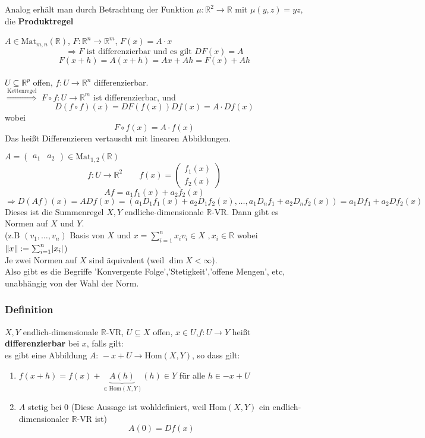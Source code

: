 Analog erhält man durch Betrachtung der Funktion $\mu : \mathbb{R}^2 \to  \mathbb{R}$ mit $\mu(y,z)=yz$, die {\bfseries Produktregel}

$A \in \text{Mat}_{m,n}(\mathbb{R})$, $F: \mathbb{R}^n \to \mathbb{R}^m$, $F(x)=A \cdot x$
\[
	\Rightarrow F \text{ ist differenzierbar und es gilt } DF(x)=A
\]
\[
	F(x+h)=A(x+h)=Ax+Ah=F(x)+Ah
\] \bewende \\
$U \subseteq \mathbb{R}^p$ offen, $f: U \to \mathbb{R}^n$ differenzierbar. \\
$\stackrel{\text{Kettenregel}}{\Rightarrow}$ $F \circ f: U \to \mathbb{R}^m$ ist differenzierbar, und 
\[
	D(f \circ f)(x)= DF(f(x))Df(x) = A \cdot Df(x)
\]
wobei
\[
	F \circ f(x)=A \cdot f(x)
\]
Das heißt Differenzieren vertauscht mit linearen Abbildungen.

$A= \begin{pmatrix}
	a_1 & a_2
\end{pmatrix} \in \text{Mat}_{1,2}(\mathbb{R})$
\[
	f: U \to \mathbb{R}^2 \qquad f(x)= \begin{pmatrix}
		f_1(x) \\ f_2(x)
	\end{pmatrix}
\]
\[
	Af=a_1f_1(x)+a_2f_2(x)
\]
\[
	\Rightarrow D(Af)(x)= A Df(x) = (a_1D_1f_1(x) + a_2D_1f_2(x), \dots, a_1D_nf_1 + a_2D_nf_2(x)) = a_1Df_1 + a_2Df_2(x) 
\]
Dieses ist die Summenregel
$X,Y$ endliche-dimensionale $\mathbb{R}$-VR. Dann gibt es Normen auf $X$ und $Y$. \\
(z.B $(v_1, \dots , v_n)$ Basis von $X$ und $x = \sum^{n}_{i=1}x_iv_i \in X \,\,,x_i \in \mathbb{R}$ wobei $\norm{x}:= \sum^{n}_{i=1}\abs{x_i}$) \\
Je zwei Normen auf $X$ sind äquivalent (weil $\dim X < \infty$). \\
Also gibt es die Begriffe 'Konvergente Folge','Stetigkeit','offene Mengen', etc, unabhängig von der Wahl der Norm.

\subsubsection{Definition} %
\label{ssub:definition}
$X,Y$ endlich-dimensionale $\mathbb{R}$-VR, $U \subseteq X$ offen, $x \in U$,$f: U \to Y$ heißt {\bfseries differenzierbar} bei $x$, falls gilt: \\
es gibt eine Abbildung $A: \,-x+U \to \text{Hom}(X,Y)$, so dass gilt:
\begin{enumerate}
	\item $f(x+h)=f(x)+\underset{\in \text{Hom}(X,Y)}{\underbrace{A(h)}}(h) \in Y$ für alle $h \in -x+U$
	\item $A$ stetig bei $0$ (Diese Aussage ist wohldefiniert, weil $\text{Hom}(X,Y)$ ein endlich-dimensionaler $\mathbb{R}$-VR ist)
	\[
		A(0)=Df(x)
	\]
\end{enumerate}


	